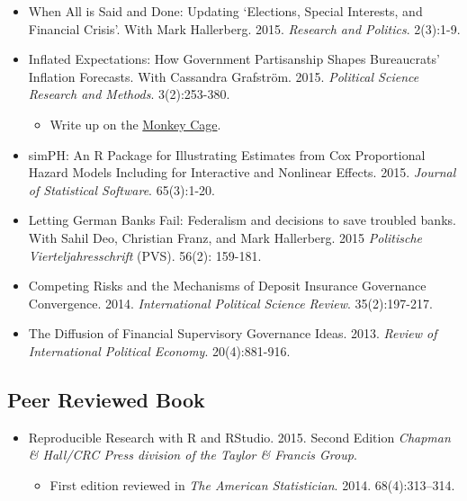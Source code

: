 \documentclass[a4paper]{article}
\begin{document}
{\begin{itemize}
    \item When All is Said and Done: Updating `Elections, Special Interests, and Financial Crisis'. With Mark Hallerberg. 2015. \emph{Research and Politics}. 2(3):1-9.

    \item Inflated Expectations: How Government Partisanship Shapes Bureaucrats' Inflation Forecasts. With Cassandra Grafstr\"{o}m. 2015. {\emph{Political Science Research and Methods}}. 3(2):253-380.

    \begin{itemize}
        \item Write up on the \href{http://www.washingtonpost.com/blogs/monkey-cage/wp/2015/01/28/the-fed-cant-accurately-forecast-inflation-heres-why-this-may-hurt-democrats/}{Monkey Cage}.
    \end{itemize}

    \item simPH: An R Package for Illustrating Estimates from Cox Proportional Hazard Models Including for Interactive and Nonlinear Effects. 2015. {\emph{Journal of Statistical Software}}. 65(3):1-20.

    \item Letting German Banks Fail: Federalism and decisions to save troubled banks. With Sahil Deo, Christian Franz, and Mark Hallerberg. 2015 \emph{Politische Vierteljahresschrift} (PVS). 56(2): 159-181.

    \item Competing Risks and the Mechanisms of Deposit Insurance Governance Convergence. 2014. {\emph{International Political Science Review}}. 35(2):197-217.

    \item The Diffusion of Financial Supervisory Governance Ideas. 2013. {\emph{Review of International Political Economy}}. 20(4):881-916.

\end{itemize}

\subsection*{Peer Reviewed Book}

\begin{itemize}
    \item Reproducible Research with R and RStudio. 2015. Second Edition {\emph{Chapman \& Hall/CRC Press division of the Taylor \& Francis Group}}.

        \begin{itemize}
            \item First edition reviewed in \emph{The American Statistician}. 2014. 68(4):313--314.
        \end{itemize}


\end{itemize}}
\end{document}
